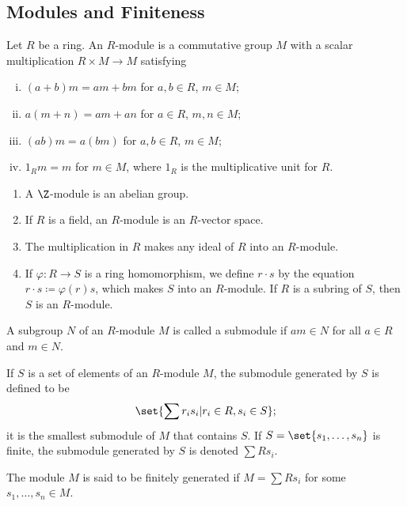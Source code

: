 \documentclass[10pt]{mypackage}
\begin{document}
\subsection{Modules and Finiteness}%
\begin{definition}
  Let $R$ be a ring. An $R$-module is a commutative group $M$ with a scalar multiplication $R\times M \rightarrow M$ satisfying
  \begin{enumerate}[(i)]
    \item $\left( a+b \right)m = am + bm$ for $a,b\in R$, $m\in M$;
    \item $a\left( m + n \right)= am + an$ for $a\in R$, $m,n\in M$;
    \item $\left( ab \right)m = a\left( bm \right)$ for $a,b\in R$, $m\in M$;
    \item $1_R m = m$ for $m\in M$, where $1_R$ is the multiplicative unit for $R$.
  \end{enumerate}
\end{definition}
\begin{example}\hfill
  \begin{enumerate}[(1)]
    \item A $\Z$-module is an abelian group.
    \item If $R$ is a field, an $R$-module is an $R$-vector space.
    \item The multiplication in $R$ makes any ideal of $R$ into an $R$-module.
    \item If $\varphi\colon R\rightarrow S$ is a ring homomorphism, we define $r\cdot s$ by the equation $r\cdot s \coloneq \varphi(r)s$, which makes $S$ into an $R$-module. If $R$ is a subring of $S$, then $S$ is an $R$-module.
  \end{enumerate}
\end{example}
\begin{definition}
  A subgroup $N$ of an $R$-module $M$ is called a submodule if $am\in N$ for all $a\in R$ and $m\in N$.\newline

  If $S$ is a set of elements of an $R$-module $M$, the submodule generated by $S$ is defined to be
  \begin{align*}
    \set{\sum r_is_i | r_i\in R,s_i\in S};
  \end{align*}
  it is the smallest submodule of $M$ that contains $S$. If $S = \set{s_1,\dots,s_n}$ is finite, the submodule generated by $S$ is denoted $\sum R s_i$.\newline

  The module $M$ is said to be finitely generated if $M = \sum Rs_i$ for some $s_1,\dots,s_n\in M$.
\end{definition}
\end{document}
